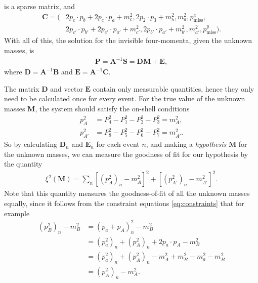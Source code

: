 \documentclass[twoside,english]{uiofysmaster}
\begin{document}
is a sparse matrix, and
\begin{align}
	\mathbf{C} = ( &2p_c \cdot p_b + 2p_c \cdot p_a + m_c^2, 2 p_2 \cdot p_3 + m_b^2, m_a^2, p_\mathrm{miss}^x, \nonumber \\ 
				   &2p_{c'}\cdot p_{b'} + 2 p_{c'} \cdot p_{a'} + m_{c'}^2, 2 p_{b'} \cdot p_{a'} + m_{b'}^2, m_{a'}^2, p_\mathrm{miss}^y ).
\end{align}
With all of this, the solution for the invisible four-momenta, given the unknown masses, is 
\begin{align}
	\mathbf{P} = \mathbf{A}^{-1} \mathbf{S} = \mathbf{D} \mathbf{M} + \mathbf{E},
\end{align}
where $\mathbf{D} = \mathbf{A}^{-1}\mathbf{B}$ and $\mathbf{E} = \mathbf{A}^{-1}\mathbf{C}$.

The matrix $\mathbf{D}$ and vector $\mathbf{E}$ contain only measurable quantities, hence they only need to be calculated once for every event. For the true value of the unknown masses $\mathbf{M}$, the system should satisfy the on-shell conditions
\begin{align}
	p_{A}^2 &= P_4^2 - P_1 ^2 - P_2^2 - P_3^2 = m_{A}^2, \nonumber\\
	p_{A'}^2 &= P_8^2 - P_5 ^2 - P_6^2 - P_7^2 = m_{A'}^2.
\end{align}
So by calculating $\mathbf{D}_n$ and $\mathbf{E}_n$ for each event $n$, and making a {\it hypothesis} $\mathbf{M}$ for the unknown masses, we can measure the goodness of fit for our hypothesis by the quantity
\begin{align}
	\xi^2(\mathbf{M}) = \sum_n \left[(p_{A}^2)_n - m_A^2\right]^2 + \left[(p_{A'}^2)_n - m_{A'}^2\right]^2. \label{eq:xisquared}
\end{align}
Note that this quantity measures the goodness-of-fit of all the unknown masses equally, since it follows from the constraint equations \eqref{eq:constraints} that for example
\begin{align}
	(p_B^2)_n - m_B^2 &= (p_a + p_A)_n^2 - m_B^2 \nonumber\\
				  &= (p_a^2)_n + (p_A^2)_n + 2p_a\cdot p_A - m_B^2\nonumber\\
				  &= (p_a^2)_n + (p_A^2)_n - m_A^2 + m_B^2 - m_a^2 - m_B^2\\
				  &= (p_A^2)_n - m_A^2.\nonumber
\end{align}
\end{document}
